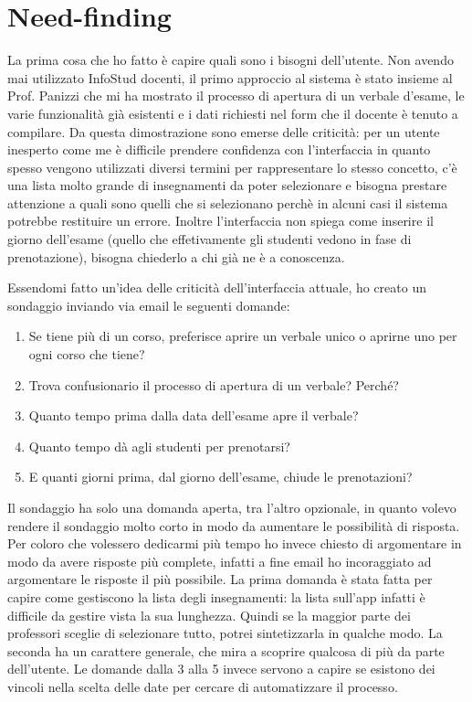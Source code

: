 \documentclass[Lau, oneside]{sapthesis}%
\begin{document}
\section{Need-finding}
\label{sec:nf}
La prima cosa che ho fatto è capire quali sono i bisogni dell'utente. Non avendo mai utilizzato InfoStud docenti, il primo approccio al sistema è stato insieme al Prof. Panizzi che mi ha mostrato il processo di apertura di un verbale d'esame, le varie funzionalità già esistenti e i dati richiesti nel form che il docente è tenuto a compilare. Da questa dimostrazione sono emerse delle criticità: per un utente inesperto come me è difficile prendere confidenza con l'interfaccia in quanto spesso vengono utilizzati diversi termini per rappresentare lo stesso concetto, c'è una lista molto grande di insegnamenti da poter selezionare e bisogna prestare attenzione a quali sono quelli che si selezionano perchè in alcuni casi il sistema potrebbe restituire un errore. Inoltre l'interfaccia non spiega come inserire il giorno dell'esame (quello che effetivamente gli studenti vedono in fase di prenotazione), bisogna chiederlo a chi già ne è a conoscenza.

Essendomi fatto un'idea delle criticità dell'interfaccia attuale, ho creato un sondaggio inviando via email le seguenti domande:

\begin{enumerate}
	\item Se tiene più di un corso, preferisce aprire un verbale unico o aprirne uno per ogni corso che tiene? 
	\item Trova confusionario il processo di apertura di un verbale? Perché?
	\item Quanto tempo prima dalla data dell’esame apre il verbale?
	\item Quanto tempo dà agli studenti per prenotarsi?
	\item E quanti giorni prima, dal giorno dell’esame, chiude le prenotazioni? 
\end{enumerate}

Il sondaggio ha solo una domanda aperta, tra l'altro opzionale, in quanto volevo rendere il sondaggio molto corto in modo da aumentare 
le possibilità di risposta. Per coloro che volessero dedicarmi più tempo ho invece chiesto di argomentare in modo da avere risposte
più complete, infatti a fine email ho incoraggiato ad argomentare le risposte il più possibile.
La prima domanda è stata fatta per capire come gestiscono la lista degli insegnamenti: la lista sull'app infatti è difficile da gestire vista la sua lunghezza. Quindi se la maggior parte dei professori sceglie di selezionare tutto, potrei sintetizzarla in qualche modo.
La seconda ha un carattere generale, che mira a scoprire qualcosa di più da parte dell'utente.
Le domande dalla 3 alla 5 invece servono a capire se esistono dei vincoli nella scelta delle date per cercare di automatizzare il processo.
\end{document}
